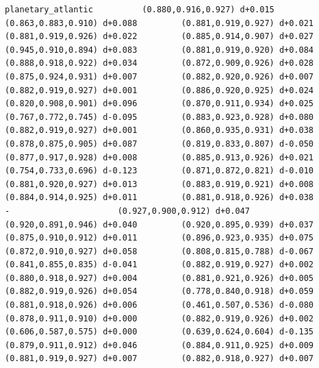 \documentclass[11pt, letterpaper, openany]{book}
\begin{document}
\begin{empiricalbox}
\begin{lstlisting}[style=terminal]
planetary_atlantic          (0.880,0.916,0.927) d+0.015         (0.863,0.883,0.910) d+0.088         (0.881,0.919,0.927) d+0.021         (0.881,0.919,0.926) d+0.022         (0.885,0.914,0.907) d+0.027         (0.945,0.910,0.894) d+0.083         (0.881,0.919,0.920) d+0.084         (0.888,0.918,0.922) d+0.034         (0.872,0.909,0.926) d+0.028         (0.875,0.924,0.931) d+0.007         (0.882,0.920,0.926) d+0.007         (0.882,0.919,0.927) d+0.001         (0.886,0.920,0.925) d+0.024         (0.820,0.908,0.901) d+0.096         (0.870,0.911,0.934) d+0.025         (0.767,0.772,0.745) d-0.095         (0.883,0.923,0.928) d+0.080         (0.882,0.919,0.927) d+0.001         (0.860,0.935,0.931) d+0.038         (0.878,0.875,0.905) d+0.087         (0.819,0.833,0.807) d-0.050         (0.877,0.917,0.928) d+0.008         (0.885,0.913,0.926) d+0.021         (0.754,0.733,0.696) d-0.123         (0.871,0.872,0.821) d-0.010         (0.881,0.920,0.927) d+0.013         (0.883,0.919,0.921) d+0.008         (0.884,0.914,0.925) d+0.011         (0.881,0.918,0.926) d+0.038                      -                      (0.927,0.900,0.912) d+0.047         (0.920,0.891,0.946) d+0.040         (0.920,0.895,0.939) d+0.037         (0.875,0.910,0.912) d+0.011         (0.896,0.923,0.935) d+0.075         (0.872,0.910,0.927) d+0.058         (0.808,0.815,0.788) d-0.067         (0.841,0.855,0.835) d-0.041         (0.882,0.919,0.927) d+0.002         (0.880,0.918,0.927) d+0.004         (0.881,0.921,0.926) d+0.005         (0.882,0.919,0.926) d+0.054         (0.778,0.840,0.918) d+0.059         (0.881,0.918,0.926) d+0.006         (0.461,0.507,0.536) d-0.080         (0.878,0.911,0.910) d+0.000         (0.882,0.919,0.926) d+0.002         (0.606,0.587,0.575) d+0.000         (0.639,0.624,0.604) d-0.135         (0.879,0.911,0.912) d+0.046         (0.884,0.911,0.925) d+0.009         (0.881,0.919,0.927) d+0.007         (0.882,0.918,0.927) d+0.007     

\end{lstlisting}
\end{empiricalbox}
\end{document}
